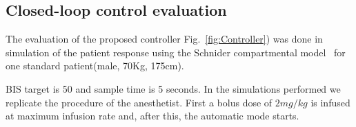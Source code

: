 \subsection{Closed-loop control evaluation}
The evaluation of the proposed controller Fig.~\ref{fig:Controller})
was done in simulation of the patient response using the Schnider
compartmental model~\cite{schnider_influence_1998} for one standard
patient(male, 70Kg, 175cm).

BIS target  is 50  and sample  time is 5 seconds. In the simulations
performed we replicate the procedure of the anesthetist. First a bolus
dose of $2mg/kg$ is infused  at maximum infusion rate and, after this,
the automatic mode starts.

